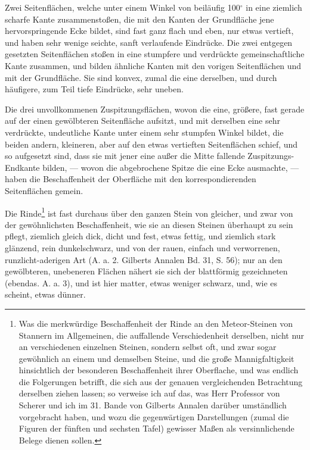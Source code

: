 \documentclass[a4paper, 11pt, oneside, german]{article}
\begin{document}
Zwei Seitenflächen, welche unter einem Winkel von beiläufig 100$^{\circ}$ in eine ziemlich scharfe Kante zusammenstoßen, die mit den Kanten der Grundfläche jene hervorspringende Ecke bildet, sind fast ganz flach und eben, nur etwas vertieft, und haben sehr wenige seichte, sanft verlaufende Eindrücke. Die zwei entgegen gesetzten Seitenflächen stoßen in eine stumpfere und verdrückte gemeinschaftliche Kante zusammen, und bilden ähnliche Kanten mit den vorigen Seitenflächen und mit der Grundfläche. Sie sind konvex, zumal die eine derselben, und durch häufigere, zum Teil tiefe Eindrücke, sehr uneben.

Die drei unvollkommenen Zuspitzungsflächen, wovon die eine, größere, fast gerade auf der einen gewölbteren Seitenfläche aufsitzt, und mit derselben eine sehr verdrückte, undeutliche Kante unter einem sehr stumpfen Winkel bildet, die beiden andern, kleineren, aber auf den etwas vertieften Seitenflächen schief, und so aufgesetzt sind, dass sie mit jener eine außer die Mitte fallende Zuspitzungs-Endkante bilden, --- wovon die abgebrochene Spitze die eine Ecke ausmachte, --- haben die Beschaffenheit der Oberfläche mit den korrespondierenden Seitenflächen gemein.

Die Rinde\footnote{Was die merkwürdige Beschaffenheit der Rinde an den Meteor-Steinen von Stannern im Allgemeinen, die auffallende Verschiedenheit derselben, nicht nur an verschiedenen einzelnen Steinen, sondern selbst oft, und zwar sogar gewöhnlich an einem und demselben Steine, und die große Mannigfaltigkeit hinsichtlich der besonderen Beschaffenheit ihrer Oberflache, und was endlich die Folgerungen betrifft, die sich aus der genauen vergleichenden Betrachtung derselben ziehen lassen; so verweise ich auf das, was Herr Professor von Scherer und ich im 31. Bande von Gilberts Annalen darüber umständlich vorgebracht haben, und wozu die gegenwärtigen Darstellungen (zumal die Figuren der fünften und sechsten Tafel) gewisser Maßen als versinnlichende Belege dienen sollen.} ist fast durchaus über den ganzen Stein von gleicher, und zwar von der gewöhnlichsten Beschaffenheit, wie sie an diesen Steinen überhaupt zu sein pflegt, ziemlich gleich dick, dicht und fest, etwas fettig, und ziemlich stark glänzend, rein dunkelschwarz, und von der rauen, einfach und verworrenen, runzlicht-aderigen Art (A. a. 2. Gilberts Annalen Bd. 31, S. 56); nur an den gewölbteren, unebeneren Flächen nähert sie sich der blattförmig gezeichneten (ebendas. A. a. 3), und ist hier matter, etwas weniger schwarz, und, wie es scheint, etwas dünner.
\end{document}
